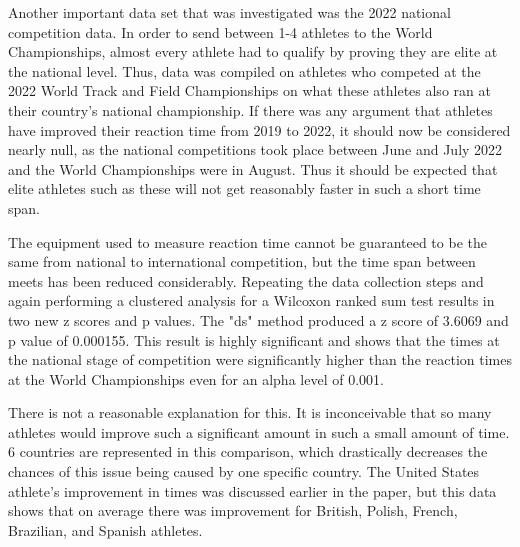 \documentclass[12pt, letterpaper, titlepage]{article}
\begin{document}
Another important data set that was investigated was the 2022 national competition
data.  In order to send between 1-4 athletes to the World Championships, almost
every athlete had to qualify by proving they are elite at the national level.
Thus, data was compiled on athletes who competed at the 2022 World Track and 
Field Championships on what these athletes also ran at their country's national
championship.  If there was any argument that athletes have improved their reaction
time from 2019 to 2022, it should now be considered nearly null, as the national
competitions took place between June and July 2022 and the World Championships
were in August.  Thus it should be expected that elite athletes such as these
will not get reasonably faster in such a short time span.

The equipment used to measure reaction time cannot be guaranteed
to be the same from national to international competition, but the time span between
meets has been reduced considerably.  Repeating the data collection steps and
again performing a clustered analysis for a Wilcoxon ranked sum test
results in two new z scores and p values.  The "ds" method produced a z score of
3.6069 and p value of 0.000155.  This result is highly significant and shows that
the times at the national stage of competition were significantly higher than
the reaction times at the World Championships even for an alpha level of 0.001.

There is not a reasonable explanation for this.  It is inconceivable that so many
athletes would improve such a significant amount in such a small amount of time.
6 countries are represented in this comparison, which drastically decreases the
chances of this issue being caused by one specific country.  The United States
athlete's improvement in times was discussed earlier in the paper, but this data
shows that on average there was improvement for British, Polish, French, Brazilian,
and Spanish athletes.
\end{document}
